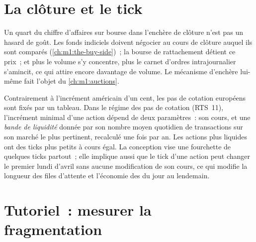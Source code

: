 \section{La clôture et le tick}

Un quart du chiffre d'affaires sur bourse dans l'enchère de clôture n'est pas un hasard
de goût. Les fonds indiciels doivent négocier au cours de clôture auquel ils sont
comparés (\cref{ch:m1:the-buy-side})~; la bourse de rattachement détient ce prix~;
et plus le volume s'y concentre, plus le carnet d'ordres intrajournalier s'amincit,
ce qui attire encore davantage de volume. Le mécanisme d'enchère lui-même fait l'objet du
\cref{ch:m1:auctions}.

Contrairement à l'incrément américain d'un cent, les pas de cotation européens sont fixés par
un tableau. Dans le régime des pas de cotation (RTS~11), l'incrément minimal d'une action
dépend de deux paramètres~: son cours, et une \emph{bande de liquidité} donnée par son
nombre moyen quotidien de transactions sur son marché le plus pertinent, recalculé une fois
par an. Les actions plus liquides ont des ticks plus petits à cours égal. La conception
vise une fourchette de quelques ticks partout~; elle implique aussi que le tick d'une action peut
changer le premier lundi d'avril sans aucune modification de son cours, ce qui modifie
la longueur des files d'attente et l'économie des  du jour au lendemain.

\section{Tutoriel~: mesurer la fragmentation}\label{tut:m1:european-equity-market-structure:frag}

